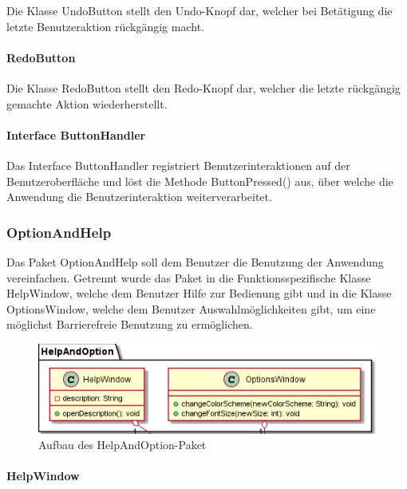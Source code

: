 \documentclass[parskip=full]{scrartcl}
\begin{document}
Die Klasse UndoButton stellt den Undo-Knopf dar, welcher bei Betätigung die letzte Benutzeraktion rückgängig macht.

\paragraph{RedoButton}

Die Klasse RedoButton stellt den Redo-Knopf dar, welcher die letzte rückgängig gemachte Aktion wiederherstellt.

\paragraph{Interface ButtonHandler}

Das Interface ButtonHandler registriert Benutzerinteraktionen auf der Benutzeroberfläche und löst die Methode ButtonPressed() aus, über welche die Anwendung die Benutzerinteraktion weiterverarbeitet.

\subsubsection{OptionAndHelp}

Das Paket OptionAndHelp soll dem Benutzer die Benutzung der Anwendung vereinfachen. Getrennt wurde das Paket in die Funktionsspezifische Klasse HelpWindow, welche dem Benutzer Hilfe zur Bedienung gibt und in die Klasse OptionsWindow, welche dem Benutzer Auswahlmöglichkeiten gibt, um eine möglichst Barrierefreie Benutzung zu ermöglichen.

\begin{figure}[htbp]
	\begin{center}
		\includegraphics[width = 14cm]{Grafiken/HelpAndOptionNamespace.png}
		\caption{Aufbau des HelpAndOption-Paket}
		\label{Entwurf_Grob}
	\end{center}
\end{figure}

\paragraph{HelpWindow}
\end{document}
